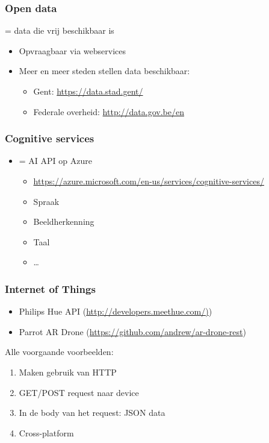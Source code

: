 \documentclass{article}
\begin{document}
\subsubsection{Open data}
= data die vrij beschikbaar is

\begin{itemize}
    \item Opvraagbaar via webservices
    \item Meer en meer steden stellen data beschikbaar:
    \begin{itemize}
        \item Gent: \url{https://data.stad.gent/}
        \item Federale overheid: \url{http://data.gov.be/en}
    \end{itemize}
\end{itemize}

\subsubsection{Cognitive services}
\begin{itemize}
    \item = AI API op Azure
    \begin{itemize}
        \item \url{https://azure.microsoft.com/en-us/services/cognitive-services/}
        \item Spraak
        \item Beeldherkenning
        \item Taal
        \item \dots
    \end{itemize}
\end{itemize}

\subsubsection{Internet of Things}
\begin{itemize}
    \item Philips Hue API (\url{http://developers.meethue.com/)})
    \item Parrot AR Drone (\url{https://github.com/andrew/ar-drone-rest})
\end{itemize}

Alle voorgaande voorbeelden:
\begin{enumerate}
    \item Maken gebruik van HTTP
    \item GET/POST request naar device
    \item In de body van het request: JSON data
    \item Cross-platform
\end{enumerate}
\end{document}
